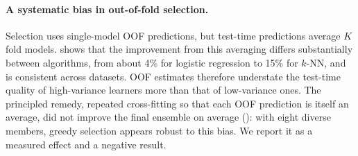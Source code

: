 \paragraph{A systematic bias in out-of-fold selection.} Selection uses
single-model OOF predictions, but test-time predictions average $K$ fold models.
 shows that the improvement from this averaging differs
substantially between algorithms, from about 4\% for logistic regression to
15\% for $k$-NN, and is consistent across datasets. OOF estimates therefore
understate the test-time quality of high-variance learners more than that of
low-variance ones. The principled remedy, repeated cross-fitting so that each
OOF prediction is itself an average, did not improve the final ensemble on
average (): with eight diverse members, greedy selection appears
robust to this bias. We report it as a measured effect and a negative result.

\begin{table}[t]
\centering
\caption{Bagging gain per algorithm on the development datasets: mean OOF log
loss of single fold models versus mean test log loss of the 5-model bag, and
the mean per-dataset relative improvement.}
\label{tab:bagging}
\small

\end{table}
